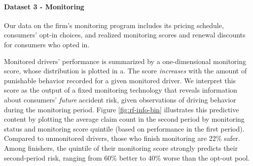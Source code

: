 \paragraph{Dataset 3 - Monitoring}
Our data on the firm's monitoring program includes its pricing schedule, consumers' opt-in choices, and realized monitoring scores and renewal discounts for consumers who opted in.

Monitored drivers' performance is summarized by a one-dimensional monitoring score, whose distribution is plotted in a. The score \textit{increases} with the amount of punishable behavior recorded for a given monitored driver. We interpret this score as the output of a fixed monitoring technology that reveals information about consumers' \emph{future} accident risk, given observations of driving behavior during the monitoring period. Figure \ref{fig:rf-info-bin} illustrates this predictive content by plotting the average claim count in the second period by monitoring status and monitoring score quintile (based on performance in the first period). Compared to unmonitored drivers, those who finish monitoring are 22\% safer. Among finishers, the quintile of their monitoring score strongly predicts their second-period risk, ranging from 60\% better to 40\% worse than the opt-out pool.

